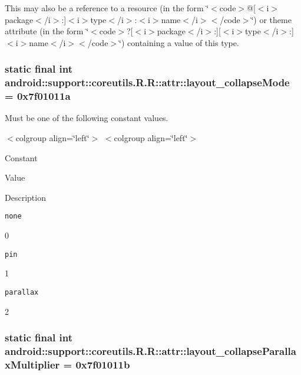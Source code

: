 This may also be a reference to a resource (in the form \char`\"{}$<$code$>$@\mbox{[}$<$i$>$package$<$/i$>$:\mbox{]}$<$i$>$type$<$/i$>$:$<$i$>$name$<$/i$>$$<$/code$>$\char`\"{}) or theme attribute (in the form \char`\"{}$<$code$>$?\mbox{[}$<$i$>$package$<$/i$>$:\mbox{]}\mbox{[}$<$i$>$type$<$/i$>$:\mbox{]}$<$i$>$name$<$/i$>$$<$/code$>$\char`\"{}) containing a value of this type. \hypertarget{classandroid_1_1support_1_1coreutils_1_1_r_1_1attr_34c775961d4cde1ae17e2f5f559baf3c}{
\subsubsection[{layout\_\-collapseMode}]{\setlength{\rightskip}{0pt plus 5cm}static final int android::support::coreutils.R.R::attr::layout\_\-collapseMode = 0x7f01011a}}
\label{classandroid_1_1support_1_1coreutils_1_1_r_1_1attr_34c775961d4cde1ae17e2f5f559baf3c}


Must be one of the following constant values. \begin{TabularC}{0}
\hline
\end{TabularC}
$<$colgroup align=\char`\"{}left\char`\"{}$>$ $<$colgroup align=\char`\"{}left\char`\"{}$>$ 

Constant

Value

Description 

{\tt none}

0

{\tt pin}

1

{\tt parallax}

2\hypertarget{classandroid_1_1support_1_1coreutils_1_1_r_1_1attr_239b822a7e5318d7ec5298f66f6b8b67}{
\subsubsection[{layout\_\-collapseParallaxMultiplier}]{\setlength{\rightskip}{0pt plus 5cm}static final int android::support::coreutils.R.R::attr::layout\_\-collapseParallaxMultiplier = 0x7f01011b}}
\label{classandroid_1_1support_1_1coreutils_1_1_r_1_1attr_239b822a7e5318d7ec5298f66f6b8b67}


